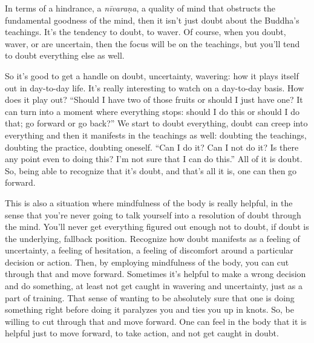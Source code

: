 In terms of a hindrance, a \emph{nīvaraṇa}, a quality of mind that
obstructs the fundamental goodness of the mind, then it isn’t just doubt
about the Buddha’s teachings. It’s the tendency to doubt, to waver. Of
course, when you doubt, waver, or are uncertain, then the focus will be
on the teachings, but you’ll tend to doubt everything else as well.

So it’s good to get a handle on doubt, uncertainty, wavering: how it
plays itself out in day-to-day life. It’s really interesting to watch on
a day-to-day basis. How does it play out? “Should I have two of those
fruits or should I just have one? It can turn into a moment where
everything stops: should I do this or should I do that; go forward or go
back?” We start to doubt everything, doubt can creep into everything and
then it manifests in the teachings as well: doubting the teachings,
doubting the practice, doubting oneself. “Can I do it? Can I not do it?
Is there any point even to doing this? I’m not sure that I can do this.”
All of it is doubt. So, being able to recognize that it’s doubt, and
that’s all it is, one can then go forward.

This is also a situation where mindfulness of the body is really
helpful, in the sense that you’re never going to talk yourself into a
resolution of doubt through the mind. You’ll never get everything
figured out enough not to doubt, if doubt is the underlying, fallback
position. Recognize how doubt manifests as a feeling of uncertainty, a
feeling of hesitation, a feeling of discomfort around a particular
decision or action. Then, by employing mindfulness of the body, you can
cut through that and move forward. Sometimes it’s helpful to make a
wrong decision and do something, at least not get caught in wavering and
uncertainty, just as a part of training. That sense of wanting to be
absolutely sure that one is doing something right before doing it
paralyzes you and ties you up in knots. So, be willing to cut through
that and move forward. One can feel in the body that it is helpful just
to move forward, to take action, and not get caught in doubt.
